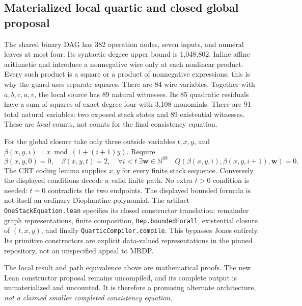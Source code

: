 \subsection{Materialized local quartic and closed global proposal}
The shared binary DAG has 382 operation nodes, seven inputs, and numeral
leaves at most four. Its syntactic degree upper bound is 1,048,802.
Inline affine arithmetic and introduce a nonnegative wire only at each
nonlinear product. Every such product is a square or a product of
nonnegative expressions; this is why the guard uses separate squares.
There are 84 wire variables. Together with $a,b,c,u,v$, the local source
has 89 natural witnesses. Its 85 quadratic residuals have a sum of squares
of exact degree four with 3,108 monomials. There are 91 total natural variables: two exposed stack states and 89 existential witnesses. These are \emph{local} counts,
not counts for the final consistency equation.

For the global closure take only three outside variables $t,x,y$, and
$\beta(x,y,i)=x\bmod(1+(i+1)y)$. Require
\[
 \beta(x,y,0)=0,\quad \beta(x,y,t)=2,\quad
 \forall i<t\ \exists\mathbf w\in\mathbb N^{89}\quad
 Q(\beta(x,y,i),\beta(x,y,i+1),\mathbf w)=0.
\]
The CRT coding lemma supplies $x,y$ for every finite stack sequence.
Conversely the displayed conditions decode a valid finite path.
No extra $t>0$ condition is needed: $t=0$ contradicts the two endpoints.
The displayed bounded formula is not itself an ordinary Diophantine
polynomial. The artifact \texttt{OneStackEquation.lean} specifies its
closed constructor translation: remainder graph representations, finite
composition, \texttt{Rep.boundedForall}, existential closure of $(t,x,y)$,
and finally \texttt{QuarticCompiler.compile}. This bypasses Jones entirely.
Its primitive constructors are explicit data-valued representations in the
pinned repository, not an unspecified appeal to MRDP.

The local result and path equivalence above are mathematical proofs. The
new Lean constructor proposal remains uncompiled, and its complete output
is unmaterialized and uncounted. It is therefore a promising alternate
architecture, \emph{not a claimed smaller completed consistency equation}.
